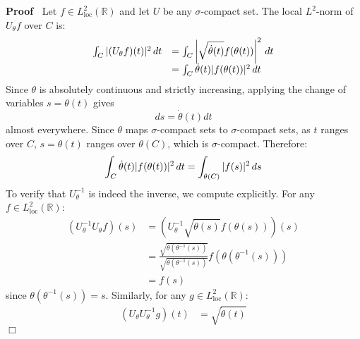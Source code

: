 \documentclass{article}
\newcommand{\tmop}[1]{\ensuremath{\operatorname{#1}}}
\newenvironment{proof}{\noindent\textbf{Proof\ }}{\hspace*{\fill}$\Box$\medskip}
\begin{document}
\begin{proof}
  Let $f \in L^2_{\tmop{loc}} (\mathbb{R})$ and let $U$ be any
  $\sigma$-compact set. The local $L^2$-norm of $U_{\theta} f$ over $C$ is:
  \begin{equation}
    \begin{array}{ll}
      \int_C | (U_{\theta} f) (t) |^2  \hspace{0.17em} dt & = \int_C \left|
      \sqrt{\dot{\theta} (t)} f (\theta (t)) \right|^2  \hspace{0.17em} dt\\
      & = \int_C \dot{\theta} (t) |f (\theta (t)) |^2  \hspace{0.17em} dt
    \end{array}
  \end{equation}
  Since $\theta$ is absolutely continuous and strictly increasing, applying
  the change of variables $s = \theta (t)$ gives
  \begin{equation}
    ds = \dot{\theta} (t) dt
  \end{equation}
  almost everywhere. Since $\theta$ maps $\sigma$-compact sets to
  $\sigma$-compact sets, as $t$ ranges over $C$, $s = \theta (t)$ ranges over
  $\theta (C)$, which is $\sigma$-compact. Therefore:
  \begin{equation}
    \int_C \dot{\theta} (t)  |f (\theta (t)) |^2 \hspace{0.17em} dt =
    \int_{\theta (C)} |f (s) |^2  \hspace{0.17em} ds
  \end{equation}
  To verify that $U_{\theta}^{- 1}$ is indeed the inverse, we compute
  explicitly. For any $f \in L^2_{\tmop{loc}} (\mathbb{R})$:
  \begin{equation}
    \begin{array}{ll}
      (U_{\theta}^{- 1} U_{\theta} f) (s) & = \left( U_{\theta}^{- 1} 
      \sqrt{\dot{\theta} (s)} f (\theta (s)) \right) (s)\\
      & = \frac{\sqrt{\dot{\theta} (\theta^{- 1} (s))}}{\sqrt{\dot{\theta}
      (\theta^{- 1} (s))}} f (\theta (\theta^{- 1} (s)))\\
      & = f (s)
    \end{array}
  \end{equation}
  since $\theta (\theta^{- 1} (s)) = s$. Similarly, for any $g \in
  L^2_{\tmop{loc}} (\mathbb{R})$:
  \begin{equation}
    \begin{array}{ll}
      (U_{\theta} U_{\theta}^{- 1} g) (t) & = \sqrt{\dot{\theta} (t)} 

\end{array}
\end{equation}
\end{proof}
\end{document}
